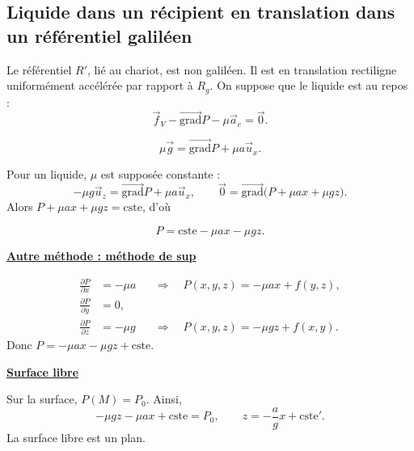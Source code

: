 \documentclass[11pt,a4paper]{article}
\newcommand{\grad}{\overrightarrow{\mathrm{grad}}}
\newcommand{\pd}[2]{\frac{\partial #1}{\partial #2}}
\newcommand{\ux}{\vec u_x}\newcommand{\uy}{\vec u_y}\newcommand{\uz}{\vec u_z}
\newcommand{\cste}{\mathrm{cste}}
\newcommand{\titr}[1]{\par\needspace{4\baselineskip}\textbf{\underline{#1}}\par}
\newcommand{\repere}[1]{\draw[->] (0,0)--(.8,0);\draw[->] (0,0)--(0,.8);\draw[->] (0,0)--(-.45,-.5);\node[below right] at (.15,-.1){$#1$};}
\begin{document}
\subsection{Liquide dans un récipient en translation dans un référentiel galiléen}
\begin{center}\end{center}
Le référentiel $R'$, lié au chariot, est non galiléen. Il est en translation rectiligne uniformément accélérée par rapport à $R_g$.
On suppose que le liquide est au repos :
\[\vec f_V-\grad P-\mu\vec a_e=\vec0.\]
\begin{cadre}\[\mu\vec g=\grad P+\mu a\ux.\]\end{cadre}
Pour un liquide, $\mu$ est supposée constante :
\[-\mu g\uz=\grad P+\mu a\ux,\qquad\vec0=\grad\bigl(P+\mu ax+\mu gz\bigr).\]
Alors $P+\mu ax+\mu gz=\cste$, d'où
\begin{cadre}\[P=\cste-\mu ax-\mu gz.\]\end{cadre}
\titr{Autre méthode : méthode de sup}
\[\begin{aligned}
\pd P x&=-\mu a &&\Longrightarrow\quad P(x,y,z)=-\mu ax+f(y,z),\\
\pd P y&=0,\\
\pd P z&=-\mu g &&\Longrightarrow\quad P(x,y,z)=-\mu gz+f(x,y).
\end{aligned}\]
Donc $P=-\mu ax-\mu gz+\cste$.
\begin{center}\end{center}
\titr{Surface libre}
Sur la surface, $P(M)=P_0$. Ainsi,
\[-\mu gz-\mu ax+\cste=P_0,\qquad z=-\frac agx+\cste'.\]
La surface libre est un plan.
\end{document}
